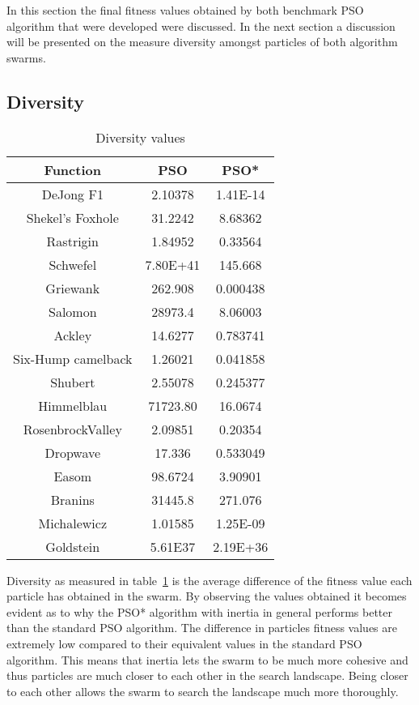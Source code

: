 In this section the final fitness values obtained by both benchmark PSO algorithm that were developed were discussed. In the next section a discussion will be presented on the measure diversity amongst particles of both algorithm swarms.
\subsection{Diversity}
\begin{table}[h]
\label{tbl:diversityValues}
\begin{center}
	\begin{tabular}{| c | c | c |}
	\hline
	Function & PSO & PSO*\\  \hline
	DeJong F1 & 2.10378 & 1.41E-14 \\ \hline
	Shekel's Foxhole & 31.2242 & 8.68362 \\ \hline
	Rastrigin & 1.84952 & 0.33564 \\ \hline
	Schwefel & 7.80E+41  & 145.668\\ \hline
	Griewank & 262.908 & 0.000438 \\ \hline
	Salomon & 28973.4  & 8.06003\\ \hline
	Ackley & 14.6277  & 0.783741\\ \hline
	Six-Hump camelback & 1.26021  & 0.041858\\ \hline
	Shubert & 2.55078  & 0.245377\\ \hline
	Himmelblau & 71723.80 & 16.0674\\ \hline
	RosenbrockValley & 2.09851  & 0.20354\\ \hline
	Dropwave & 17.336 & 0.533049\\ \hline
	Easom & 98.6724 & 3.90901\\ \hline
	Branins & 31445.8 & 271.076\\ \hline
	Michalewicz & 1.01585 & 1.25E-09\\ \hline
	Goldstein & 5.61E37 & 2.19E+36\\ \hline
	\end{tabular}
\end{center}
\caption{Diversity values}
\end{table}
Diversity as measured in table~\ref{tbl:diversityValues} is the average difference of the fitness value each particle has obtained in the swarm. By observing the values obtained it becomes evident as to why the PSO* algorithm with inertia in general performs better than the standard PSO algorithm. The difference in particles fitness values are extremely low compared to their equivalent values in the standard PSO algorithm. This means that inertia lets the swarm to be much more cohesive and thus particles are much closer to each other in the search landscape. Being closer to each other allows the swarm to search the landscape much more thoroughly.

